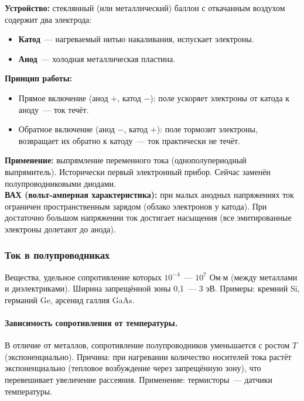\documentclass[12pt]{article}
\begin{document}
\begin{definition}
	\textbf{Устройство:} стеклянный (или металлический) баллон с откачанным воздухом содержит два электрода:
	\begin{itemize}
		\item \textbf{Катод}~--- нагреваемый нитью накаливания, испускает электроны.
		\item \textbf{Анод}~--- холодная металлическая пластина.
	\end{itemize}
	\textbf{Принцип работы:}
	\begin{itemize}
		\item Прямое включение (анод $+$, катод $-$): поле ускоряет электроны от катода к аноду~--- ток течёт.
		\item Обратное включение (анод $-$, катод $+$): поле тормозит электроны, возвращает их обратно к катоду~--- ток практически не течёт.
	\end{itemize}
	\textbf{Применение:} выпрямление переменного тока (однополупериодный выпрямитель). Исторически первый электронный прибор. Сейчас заменён полупроводниковыми диодами.\\
	\textbf{ВАХ (вольт-амперная характеристика):} при малых анодных напряжениях ток ограничен пространственным зарядом (облако электронов у катода). При достаточно большом напряжении ток достигает насыщения (все эмитированные электроны долетают до анода).
\end{definition}

\subsubsection{Ток в полупроводниках}

\begin{definition}[Полупроводники]
	Вещества, удельное сопротивление которых $10^{-4}$~--- $10^{7}$ Ом$\cdot$м (между металлами и диэлектриками). Ширина запрещённой зоны 0,1~--- 3 эВ. Примеры: кремний Si, германий Ge, арсенид галлия GaAs.
\end{definition}

\paragraph{Зависимость сопротивления от температуры.}
В отличие от металлов, сопротивление полупроводников уменьшается с ростом $T$ (экспоненциально). Причина: при нагревании количество носителей тока растёт экспоненциально (тепловое возбуждение через запрещённую зону), что перевешивает увеличение рассеяния. Применение: термисторы~--- датчики температуры.
\end{document}
